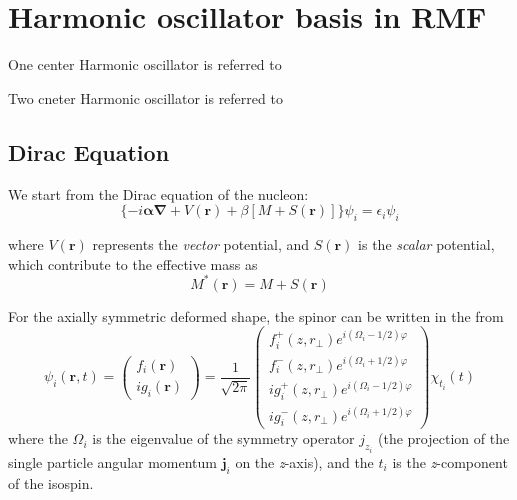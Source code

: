 \chapter{Harmonic oscillator basis in RMF}
\begin{introduction}
  \item One center Harmonic oscillator is referred to 
  \item Two cneter Harmonic oscillator is referred to
\end{introduction}

  \section{Dirac Equation}
  We start from the Dirac equation of the nucleon:
  \begin{equation}
      \{ -i\boldsymbol{\alpha \nabla } + V(\boldsymbol{r}) + \beta[M + S(\boldsymbol{r})] \} \psi_i = \epsilon_i \psi_i   \label{oc_dirac}
  \end{equation}

  where $V(\boldsymbol{r})$ represents the \textit{vector} potential, and $S(\boldsymbol{r})$ is the \textit{scalar} potential, which contribute to the effective mass as
  \begin{equation}
    M^{*}(\boldsymbol{r}) = M + S(\boldsymbol{r})   \label{oc_effectiv_mass}
  \end{equation}

  For the axially symmetric deformed shape, the spinor can be written in the from
  \begin{equation}
    \psi_{i}(\boldsymbol{r}, t)=\left(\begin{array}{c}
    f_{i}(\boldsymbol{r}) \\
    i g_{i}(\boldsymbol{r})
    \end{array}\right)=\frac{1}{\sqrt{2 \pi}}\left(\begin{array}{c}
    f_{i}^{+}\left(z, r_{\perp}\right) e^{i\left(\Omega_{i}-1 / 2\right) \varphi} \\
    f_{i}^{-}\left(z, r_{\perp}\right) e^{i\left(\Omega_{i}+1 / 2\right) \varphi} \\
    i g_{i}^{+}\left(z, r_{\perp}\right) e^{i\left(\Omega_{i}-1 / 2\right) \varphi} \\
    i g_{i}^{-}\left(z, r_{\perp}\right) e^{i\left(\Omega_{i}+1 / 2\right) \varphi}
    \end{array}\right) \chi_{t_{i}}(t)
  \end{equation}
  where the $\Omega_i$ is the eigenvalue of the symmetry operator $j_{z_i}$ (the projection of the single particle angular momentum $\bm{j}_i$ on the \textit{z}-axis), and the $t_i$ is the \textit{z}-component of the isospin.
  
